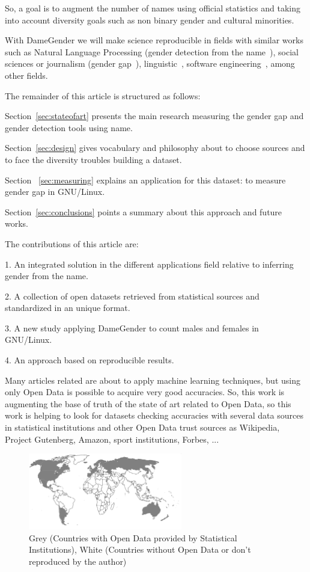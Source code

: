 \documentclass[a4paper]{article}
\begin{document}
So, a goal is to augment the number of names using official statistics
and taking into account diversity goals such as non binary gender and
cultural minorities.

With DameGender we will make science reproducible\cite{peng2011reproducible}
in fields with similar works such as Natural Language Processing
(gender detection from the name~\cite{sun2019mitigating}), social
sciences or journalism (gender
gap~\cite{holman2018gender,mislove2011understanding,niemi2017gendered,de2014genero}),
linguistic~\cite{hutson2016gender,al2009socio},
software engineering~\cite{vasilescu2012gender}, among other fields.

The remainder of this article is structured as follows:

Section~\ref{sec:stateofart} presents the main research measuring the
gender gap and gender detection tools using name.

Section~\ref{sec:design} gives vocabulary and philosophy about to
choose sources and to face the diversity troubles building a dataset.

Section ~\ref{sec:measuring} explains an application for this
dataset: to measure gender gap in GNU/Linux.

Section~\ref{sec:conclusions} points a summary about this approach and
future works.

The contributions of this article are:

1. An integrated solution in the different applications field relative
to inferring gender from the name.

2. A collection of open datasets retrieved from statistical sources
and standardized in an unique format.

3. A new study applying DameGender to count males and females in
GNU/Linux.

4. An approach based on reproducible results.

Many articles related are about to apply machine learning techniques,
but using only Open Data is possible to acquire very good accuracies.
So, this work is augmenting the base of truth of the state of art
related to Open Data, so this work is helping to look for datasets
checking accuracies with several data sources in statistical
institutions and other Open Data trust sources as Wikipedia,
Project Gutenberg, Amazon, sport institutions, Forbes, ...

\begin{figure}
  \centering
  \includegraphics[width=0.6\textwidth]{images/mapamundi-politico-mudo.pdf}
  \caption[Caption for LOF]{Grey (Countries with Open Data provided by Statistical Institutions), White (Countries without Open Data or don't reproduced by the author)}
\end{figure}
\end{document}
